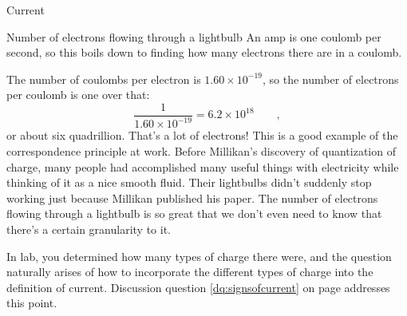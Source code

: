 \begin{envsubsection}{Current}
\begin{eg}{Number of electrons flowing through a lightbulb}
\eganswer 
An amp is one coulomb per second, so this boils down to finding
how many electrons there are in a coulomb.

The number of coulombs per electron is $1.60\times10^{-19}$,
so the number of electrons per coulomb is one over that:
\begin{equation*}
	\frac{1}{1.60\times10^{-19}} = 6.2\times10^{18} \qquad ,
\end{equation*}
or about six quadrillion. That's a lot of electrons!
This is a good example of the correspondence principle at work.
Before Millikan's discovery of quantization of charge, many
people had accomplished many useful things with electricity while thinking
of it as a nice smooth fluid. Their lightbulbs didn't
suddenly stop working just because Millikan published his paper. The
number of electrons flowing through a lightbulb is so great that we don't
even need to know that there's a certain granularity to it.
\end{eg}

In lab, you determined how many types of charge there were, and the
question naturally arises of how to incorporate the different types
of charge into the definition of current. Discussion question
\ref{dq:signsofcurrent} on page \pageref{dq:signsofcurrent} addresses
this point.
\end{envsubsection}
